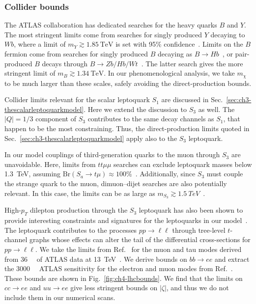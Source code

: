 \subsubsection{Collider bounds}

The ATLAS collaboration has dedicated searches for the heavy quarks $B$ and $Y$.
The most stringent limits come from searches for singly produced $Y$ decaying to
$W b$, where a limit of $m_{Y} \gtrsim \SI{1.85}{\TeV}$ is set with 95\%
confidence~\cite{Aaboud:2018ifs}. Limits on the $B$ fermion come from searches
for singly produced $B$ decaying as $B \to Hb$~\cite{ATLAS-CONF-2018-024}, or
pair-produced $B$ decays through $B \to Zb/Hb/Wt$~\cite{Aaboud:2018pii}. The
latter search gives the more stringent limit of $m_{B} \gtrsim \SI{1.34}{\TeV}$.
In our phenomenological analysis, we take $m_{\chi}$ to be much larger than
these scales, safely avoiding the direct-production bounds.

Collider limits relevant for the scalar leptoquark $S_{1}$ are discussed in
Sec.~\ref{sec:ch3-thescalarleptoquarkmodel}. Here we extend the discussion to
$S_{3}$ as well. The $|Q| = 1/3$ component of $S_{3}$ contributes to the same
decay channels as $S_{1}$, that happen to be the most constraining. Thus, the
direct-production limits quoted in Sec.~\ref{sec:ch3-thescalarleptoquarkmodel}
apply also to the $S_{3}$ leptoquark.

In our model couplings of third-generation quarks to the muon through $S_{3}$
are unavoidable. Here, limits from $tt\mu\mu$ searches can exclude leptoquark
masses below \SI{1.3}{\TeV}, assuming
$\text{Br}(S_{a} \to t \mu) \approx 100\%$~\cite{Sirunyan:2018ruf}.
Additionally, since $S_{3}$ must couple the strange quark to the muon,
dimuon--dijet searches are also potentially relevant. In this case, the limits
can be as large as $m_{S_{3}} \gtrsim \SI{1.5}{TeV}$~\cite{Aaboud:2019jcc,
  Sirunyan:2018ryt}.

High-$p_T$ dilepton production through the $S_{3}$ leptoquark has also been
shown to provide interesting constraints and signatures for the leptoquarks in
our model~\cite{Angelescu:2018tyl}. The leptoquark contributes to the processes
$pp \to \ell \ell$ through tree-level $t$-channel graphs whose effects can alter
the tail of the differential cross-sections for $pp \to \ell \ell$. We take the
limits from Ref.~\cite{Angelescu:2018tyl} for the muon and tau modes derived
from \SI{36}{\per\fb} of ATLAS data at \SI{13}{\TeV}~\cite{Aaboud:2017sjh,
  Aaboud:2017buh}. We derive bounds on $bb \to ee$ and extract the
\SI{3000}{\per\fb} ATLAS sensitivity for the electron and muon modes from
Ref.~\cite{Greljo:2017vvb}. These bounds are shown in
Fig.~\ref{fig:ch4-lhcbounds}. We find that the limits on $cc \to ee$ and
$uu \to ee$ give less stringent bounds on $|\zeta|$, and thus we do not include
them in our numerical scans.

